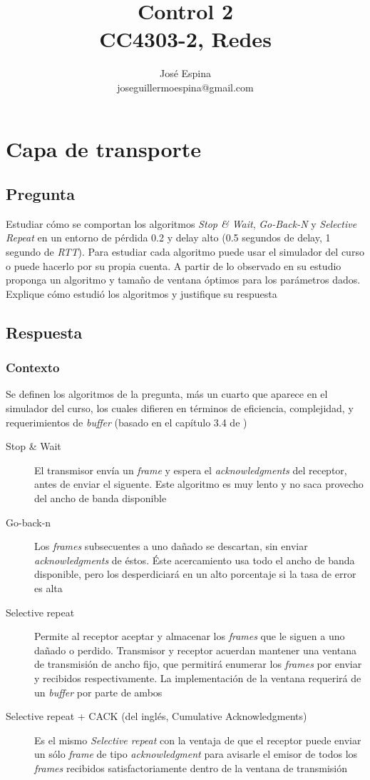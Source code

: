 \documentclass{article}
\begin{document}
\title{Control 2\\CC4303-2, Redes}
\author{José Espina\\joseguillermoespina@gmail.com}
\date{}
\maketitle
\section{Capa de transporte}

\subsection{Pregunta}
Estudiar cómo se comportan los algoritmos \textit{Stop \& Wait}, \textit{Go-Back-N} y \textit{Selective Repeat} en un entorno de pérdida 0.2 y delay alto (0.5 segundos de delay, 1 segundo de \textit{RTT}). Para estudiar cada algoritmo puede usar el simulador del curso o puede hacerlo por su propia cuenta. A partir de lo observado en su estudio proponga un algoritmo y tamaño de ventana óptimos para los parámetros dados. Explique cómo estudió los algoritmos y justifique su respuesta
\subsection{Respuesta}
\subsubsection{Contexto}
Se definen los algoritmos de la pregunta, más un cuarto que aparece en el simulador del curso, los cuales difieren en términos de eficiencia, complejidad, y requerimientos de \textit{buffer} (basado en el capítulo 3.4 de \cite{tanenbaum})
\begin{description}
\item[Stop \& Wait] El transmisor envía un \textit{frame} y espera el \textit{acknowledgments} del receptor, antes de enviar el siguente. Este algoritmo es muy lento y no saca provecho del ancho de banda disponible
\item[Go-back-n] Los \textit{frames} subsecuentes a uno dañado se descartan, sin enviar \textit{acknowledgments} de éstos. Éste acercamiento usa todo el ancho de banda disponible, pero los desperdiciará en un alto porcentaje si la tasa de error es alta
\item[Selective repeat] Permite al receptor aceptar y almacenar los \textit{frames} que le siguen a uno dañado o perdido. Transmisor y receptor acuerdan mantener una ventana de transmisión de ancho fijo, que permitirá enumerar los \textit{frames} por enviar y recibidos respectivamente. La implementación de la ventana requerirá de un \textit{buffer} por parte de ambos
\item[Selective repeat + CACK (del inglés, Cumulative Acknowledgments)] Es el mismo \textit{Selective repeat} con la ventaja de que el receptor puede enviar un sólo \textit{frame} de tipo \textit{acknowledgment} para avisarle el emisor de todos los \textit{frames} recibidos satisfactoriamente dentro de la ventana de transmisión
\end{description}
\end{document}
